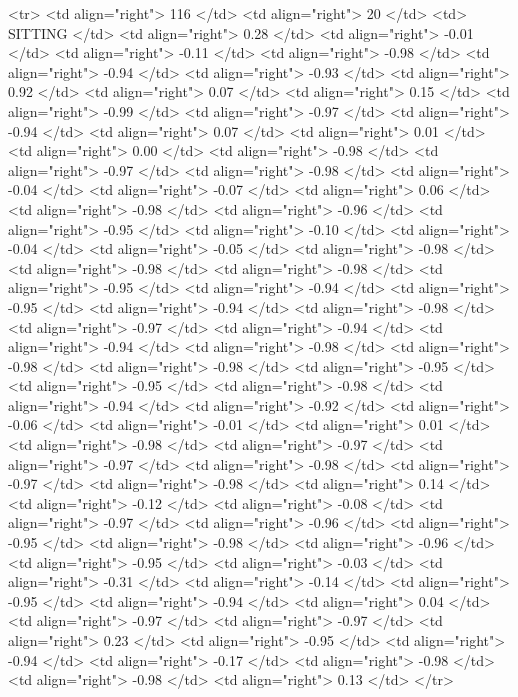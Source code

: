   <tr> <td align="right"> 116 </td> <td align="right">  20 </td> <td> SITTING </td> <td align="right"> 0.28 </td> <td align="right"> -0.01 </td> <td align="right"> -0.11 </td> <td align="right"> -0.98 </td> <td align="right"> -0.94 </td> <td align="right"> -0.93 </td> <td align="right"> 0.92 </td> <td align="right"> 0.07 </td> <td align="right"> 0.15 </td> <td align="right"> -0.99 </td> <td align="right"> -0.97 </td> <td align="right"> -0.94 </td> <td align="right"> 0.07 </td> <td align="right"> 0.01 </td> <td align="right"> 0.00 </td> <td align="right"> -0.98 </td> <td align="right"> -0.97 </td> <td align="right"> -0.98 </td> <td align="right"> -0.04 </td> <td align="right"> -0.07 </td> <td align="right"> 0.06 </td> <td align="right"> -0.98 </td> <td align="right"> -0.96 </td> <td align="right"> -0.95 </td> <td align="right"> -0.10 </td> <td align="right"> -0.04 </td> <td align="right"> -0.05 </td> <td align="right"> -0.98 </td> <td align="right"> -0.98 </td> <td align="right"> -0.98 </td> <td align="right"> -0.95 </td> <td align="right"> -0.94 </td> <td align="right"> -0.95 </td> <td align="right"> -0.94 </td> <td align="right"> -0.98 </td> <td align="right"> -0.97 </td> <td align="right"> -0.94 </td> <td align="right"> -0.94 </td> <td align="right"> -0.98 </td> <td align="right"> -0.98 </td> <td align="right"> -0.98 </td> <td align="right"> -0.95 </td> <td align="right"> -0.95 </td> <td align="right"> -0.98 </td> <td align="right"> -0.94 </td> <td align="right"> -0.92 </td> <td align="right"> -0.06 </td> <td align="right"> -0.01 </td> <td align="right"> 0.01 </td> <td align="right"> -0.98 </td> <td align="right"> -0.97 </td> <td align="right"> -0.97 </td> <td align="right"> -0.98 </td> <td align="right"> -0.97 </td> <td align="right"> -0.98 </td> <td align="right"> 0.14 </td> <td align="right"> -0.12 </td> <td align="right"> -0.08 </td> <td align="right"> -0.97 </td> <td align="right"> -0.96 </td> <td align="right"> -0.95 </td> <td align="right"> -0.98 </td> <td align="right"> -0.96 </td> <td align="right"> -0.95 </td> <td align="right"> -0.03 </td> <td align="right"> -0.31 </td> <td align="right"> -0.14 </td> <td align="right"> -0.95 </td> <td align="right"> -0.94 </td> <td align="right"> 0.04 </td> <td align="right"> -0.97 </td> <td align="right"> -0.97 </td> <td align="right"> 0.23 </td> <td align="right"> -0.95 </td> <td align="right"> -0.94 </td> <td align="right"> -0.17 </td> <td align="right"> -0.98 </td> <td align="right"> -0.98 </td> <td align="right"> 0.13 </td> </tr>
